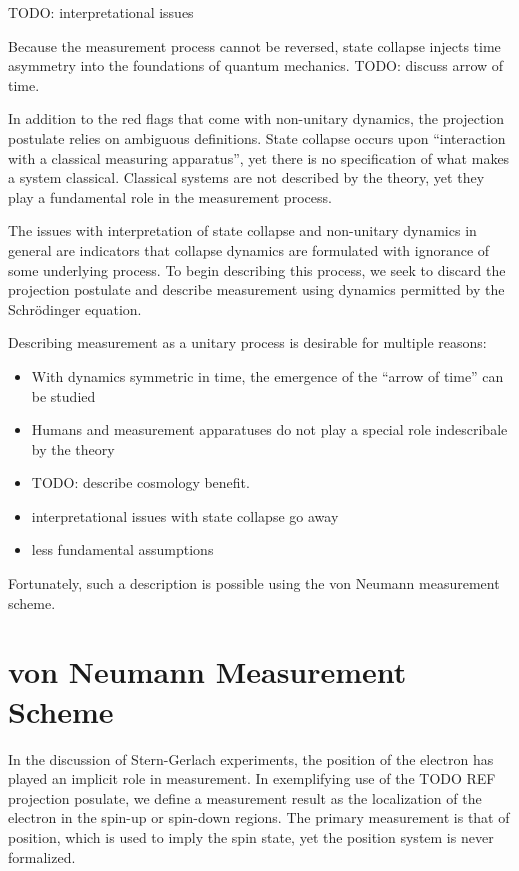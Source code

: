 TODO: interpretational issues

Because the measurement process cannot be reversed, state collapse injects time asymmetry into the foundations of quantum mechanics. TODO: discuss arrow of time.

In addition to the red flags that come with non-unitary dynamics, the projection postulate relies on ambiguous definitions. State collapse occurs upon ``interaction with a classical measuring apparatus'', yet there is no specification of what makes a system classical. Classical systems are not described by the theory, yet they play a fundamental role in the measurement process.

The issues with interpretation of state collapse and non-unitary dynamics in general are indicators that collapse dynamics are formulated with ignorance of some underlying process. To begin describing this process, we seek to discard the projection postulate and describe measurement using dynamics permitted by the Schrödinger equation.

Describing measurement as a unitary process is desirable for multiple reasons:
\begin{itemize}
  \item With dynamics symmetric in time, the emergence of the ``arrow of time'' can be studied
  \item Humans and measurement apparatuses do not play a special role indescribale by the theory
  \item TODO: describe cosmology benefit.
  \item interpretational issues with state collapse go away
  \item less fundamental assumptions
\end{itemize}

Fortunately, such a description is possible using the von Neumann measurement scheme.

\section{von Neumann Measurement Scheme}
In the discussion of Stern-Gerlach experiments, the position of the electron has played an implicit role in measurement. In exemplifying use of the TODO REF projection posulate, we define a measurement result as the localization of the electron in the spin-up or spin-down regions. The primary measurement is that of position, which is used to imply the spin state, yet the position system is never formalized.

